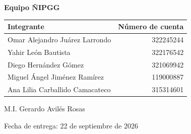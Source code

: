 \begin{titlepage}
\begin{center}
    \begin{tcolorbox}[
      colback=white,
      colframe=unamgold,
      width=0.88\textwidth,
      arc=2mm,
      boxrule=1pt
    ]
      \centering
      {\fontsize{15}{18}\selectfont\textbf{Equipo ÑIPGG}\par}
      \vspace{0.3cm}
      \small
      \begin{tabularx}{0.94\linewidth}{@{}Xr@{}}
        \toprule
        \textbf{Integrante} & \textbf{Número de cuenta} \\
        \midrule
        Omar Alejandro Juárez Larrondo & 322245244 \\
        Yahir León Bautista & 322176542 \\
        Diego Hernández Gómez & 321069942 \\
        Miguel Ángel Jiménez Ramírez & 119000887 \\
        Ana Lilia Carballido Camacateco & 315314601 \\
        \bottomrule
      \end{tabularx}
    \end{tcolorbox}

    \vfill
    {\small M.I. Gerardo Avilés Rosas\par}
    {\small Fecha de entrega: 22 de septiembre de 2026\par}
    \vspace{0.35cm}
  \end{center}
\end{titlepage}
